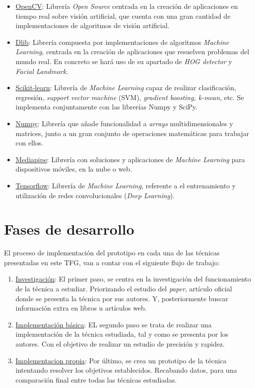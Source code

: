 \begin{itemize}
	\item \underline{OpenCV}: Librería \textit{Open Source} centrada en la creación de aplicaciones en tiempo real sobre visión artificial, que cuenta con una gran cantidad de implementaciones de algoritmos de visión artificial.
	\item \underline{Dlib}: Librería compuesta por implementaciones de algoritmos \textit{Machine Learning}, centrada en la creación de aplicaciones que resuelven problemas del mundo real. En concreto se hará uso de su apartado de \textit{HOG detector} y \textit{Facial Landmark}.
	\item \underline{Scikit-learn}: Librería de \textit{Machine Learning} capaz de realizar clasificación, regresión, \textit{support vector machine} (SVM), \textit{gradient boosting, \textit{k-mean}}, etc. Se implementa conjuntamente con las librerías Numpy y SciPy.
	\item \underline{Numpy}: Librería que añade funcionalidad a \textit{arrays} multidimensionales y matrices, junto a un gran conjunto de operaciones matemáticas para trabajar con ellos.
	\item \underline{Mediapipe}: Librería con soluciones y aplicaciones de \textit{Machine Learning} para dispositivos móviles, en la nube o web.
	\item \underline{Tensorflow}: Librería de \textit{Machine Learning}, referente a el entrenamiento y utilización de redes convolucionales (\textit{Deep Learning}).
\end{itemize}

\vspace{-0.5cm}
\section*{Fases de desarrollo}

El proceso de implementación del prototipo en cada una de las técnicas presentadas en este TFG, van a contar con el siguiente flujo de trabajo:

\begin{enumerate}
	\item \underline{Investigación}: El primer paso, se centra en la investigación del funcionamiento de la técnica a estudiar. Priorizando el estudio del \textit{paper}, artículo oficial donde se presenta la técnica por sus autores. Y, posteriormente buscar información extra en libros u artículos web.
	\item \underline{Implementación básica}: EL segundo paso se trata de realizar una implementación de la técnica estudiada, tal y como se presenta por los autores. Con el objetivo de realizar un estudio de precisión y rapidez.
	\item \underline{Implementacion propia}: Por último, se crea un prototipo de la técnica intentando resolver los objetivos establecidos. Recabando datos, para una comparación final entre todas las técnicas estudiadas.
\end{enumerate}

